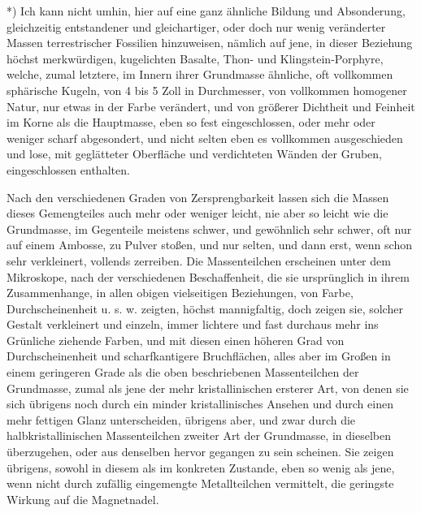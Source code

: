 \documentclass[a4paper, 11pt, oneside, german]{article}
\begin{document}
*) Ich kann nicht umhin, hier auf eine ganz ähnliche Bildung und Absonderung, gleichzeitig entstandener und gleichartiger, oder doch nur wenig veränderter Massen terrestrischer Fossilien hinzuweisen, nämlich auf jene, in dieser Beziehung höchst merkwürdigen, kugelichten Basalte, Thon- und Klingstein-Porphyre, welche, zumal letztere, im Innern ihrer Grundmasse ähnliche, oft vollkommen sphärische Kugeln, von 4 bis 5 Zoll in Durchmesser, von vollkommen homogener Natur, nur etwas in der Farbe verändert, und von größerer Dichtheit und Feinheit im Korne als die Hauptmasse, eben so fest eingeschlossen, oder mehr oder weniger scharf abgesondert, und nicht selten eben es vollkommen ausgeschieden und lose, mit geglätteter Oberfläche und verdichteten Wänden der Gruben, eingeschlossen enthalten.

Nach den verschiedenen Graden von Zersprengbarkeit lassen sich die Massen dieses Gemengteiles auch mehr oder weniger leicht, nie aber so leicht wie die Grundmasse, im Gegenteile meistens schwer, und gewöhnlich sehr schwer, oft nur auf einem Ambosse, zu Pulver stoßen, und nur selten, und dann erst, wenn schon sehr verkleinert, vollends zerreiben. Die Massenteilchen erscheinen unter dem Mikroskope, nach der verschiedenen Beschaffenheit, die sie ursprünglich in ihrem Zusammenhange, in allen obigen vielseitigen Beziehungen, von Farbe, Durchscheinenheit u. s. w. zeigten, höchst mannigfaltig, doch zeigen sie, solcher Gestalt verkleinert und einzeln, immer lichtere und fast durchaus mehr ins Grünliche ziehende Farben, und mit diesen einen höheren Grad von Durchscheinenheit und scharfkantigere Bruchflächen, alles aber im Großen in einem geringeren Grade als die oben beschriebenen Massenteilchen der Grundmasse, zumal als jene der mehr kristallinischen ersterer Art, von denen sie sich übrigens noch durch ein minder kristallinisches Ansehen und durch einen mehr fettigen Glanz unterscheiden, übrigens aber, und zwar durch die halbkristallinischen Massenteilchen zweiter Art der Grundmasse, in dieselben überzugehen, oder aus denselben hervor gegangen zu sein scheinen. Sie zeigen übrigens, sowohl in diesem als im konkreten Zustande, eben so wenig als jene, wenn nicht durch zufällig eingemengte Metallteilchen vermittelt, die geringste Wirkung auf die Magnetnadel.
\end{document}
